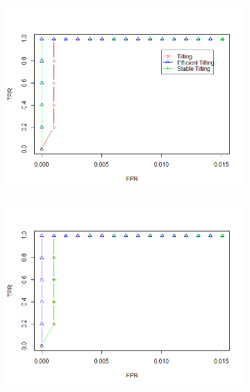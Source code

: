 \documentclass[11pt]{report}\usepackage[utf8]{inputenc}
\begin{document}
\begin{figure}[h]
    \centering
    \begin{subfigure}[b]{0.3\textwidth}
        \includegraphics[width=\textwidth]{../plots/AR09}
        \caption{}
    \end{subfigure}
    \begin{subfigure}[b]{0.3\textwidth}
        \includegraphics[width=\textwidth]{../plots/AR06}
        \caption{}
    \end{subfigure}
    \begin{subfigure}[b]{0.3\textwidth}

\end{subfigure}
\end{figure}
\end{document}
